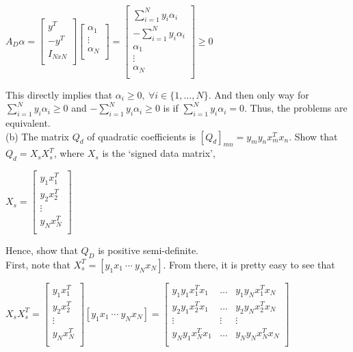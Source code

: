 \documentclass[12pt]{article}
\begin{document}
	\begin{center}
		$A_D \alpha = \left[ 
		\begin{array}{c}
		y^T\\
		-y^T\\
		I_{N x N}\\
		\end{array} \right] 
		\left[ 
		\begin{array}{c}
		\alpha_1\\
		\vdots\\
		\alpha_N\\
		\end{array} \right] = \left[ 
		\begin{array}{c}
		\sum_{i=1}^{N}y_i\alpha_i\\
		-\sum_{i=1}^{N}y_i\alpha_i\\
		\alpha_1\\
		\vdots \\
		\alpha_N\\
		\end{array} \right] \ge 0$
	\end{center}
	This directly implies that $\alpha_i \ge 0, \ \forall i \in \{1,\dots,N\}$. And then only way for $\sum_{i=1}^{N}y_i\alpha_i \ge 0$ and $-\sum_{i=1}^{N}y_i\alpha_i \ge 0$ is if $\sum_{i=1}^{N}y_i\alpha_i = 0$. Thus, the problems are equivalent.
	\\(b) The matrix $Q_d$ of quadratic coefficients is $[Q_d]_{mn} = y_m y_n x^T_m x_n$.
	Show that $Q_d = X_s X^T_s$, where $X_s$ is the `signed data matrix',\\ 
	\begin{center}
			$X_s = \left[
			\begin{array}{c}
			y_1x_1^T\\
			y_2x_2^T\\
			\vdots\\
			y_Nx_N^T\\
			\end{array} \right]$
	\end{center}
	Hence, show that $Q_D$ is positive semi-definite. \\
	First, note that $X_s^T = [y_1x_1 \ \cdots \ y_Nx_N]$. From there, it is pretty easy to see that 
		\begin{center}
			$X_s X_s^T= \left[
			\begin{array}{c}
			y_1x_1^T\\
			y_2x_2^T\\
			\vdots\\
			y_Nx_N^T\\
			\end{array} \right] [y_1x_1 \ \cdots \ y_Nx_N] = \left[
			\begin{array}{ccc}
			y_1y_1x_1^Tx_1&\dots&y_1y_Nx_1^Tx_N \\
			y_2y_1x_2^Tx_1&\dots&y_2y_Nx_2^Tx_N \\
			\vdots & \vdots & \vdots \\
			y_Ny_1x_N^Tx_1&\dots&y_Ny_Nx_N^Tx_N \\
			\end{array}
			\right]$
		\end{center}
\end{document}
